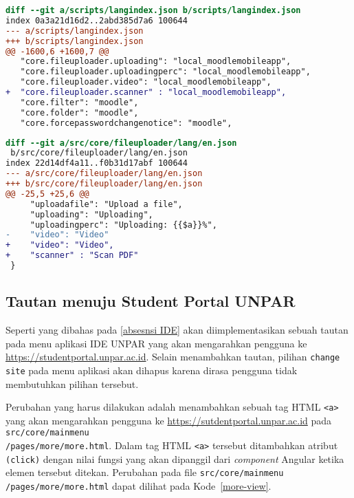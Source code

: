 \begin{lstlisting}[language=diff, frame=single, label ={langindex.json}, caption = Perubahan pada file \texttt{langindex.json} ]
diff --git a/scripts/langindex.json b/scripts/langindex.json
index 0a3a21d16d2..2abd385d7a6 100644
--- a/scripts/langindex.json
+++ b/scripts/langindex.json
@@ -1600,6 +1600,7 @@
   "core.fileuploader.uploading": "local_moodlemobileapp",
   "core.fileuploader.uploadingperc": "local_moodlemobileapp",
   "core.fileuploader.video": "local_moodlemobileapp",
+  "core.fileuploader.scanner" : "local_moodlemobileapp",
   "core.filter": "moodle",
   "core.folder": "moodle",
   "core.forcepasswordchangenotice": "moodle",
\end{lstlisting} 

\begin{lstlisting}[language=diff, frame=single, label ={fileuploader-lang-eng}, caption = Perubahan pada file \texttt{src/core/fileuploader/lang/en.json} ]
diff --git a/src/core/fileuploader/lang/en.json
 b/src/core/fileuploader/lang/en.json
index 22d14df4a11..f0b31d17abf 100644
--- a/src/core/fileuploader/lang/en.json
+++ b/src/core/fileuploader/lang/en.json
@@ -25,5 +25,6 @@
     "uploadafile": "Upload a file",
     "uploading": "Uploading",
     "uploadingperc": "Uploading: {{$a}}%",
-    "video": "Video"
+    "video": "Video",
+    "scanner" : "Scan PDF"
 }
\end{lstlisting} 

\subsection{Tautan menuju Student Portal UNPAR}
Seperti yang dibahas pada \ref{absesnsi IDE} akan diimplementasikan sebuah tautan pada menu aplikasi IDE UNPAR yang akan mengarahkan pengguna ke \url{https://studentportal.unpar.ac.id}. Selain menambahkan tautan, pilihan \texttt{change site} pada menu aplikasi akan dihapus karena dirasa pengguna tidak membutuhkan pilihan tersebut.

Perubahan yang harus dilakukan adalah menambahkan sebuah tag HTML \texttt{<a>} yang akan mengarahkan pengguna ke \url{https://sutdentportal.unpar.ac.id} pada \texttt{src/core/mainmenu\\/pages/more/more.html}. Dalam tag HTML \texttt{<a>} tersebut ditambahkan atribut \texttt{(click)} dengan nilai fungsi yang akan dipanggil dari \textit{component} Angular ketika elemen tersebut ditekan. Perubahan pada file \texttt{src/core/mainmenu\\/pages/more/more.html} dapat dilihat pada \mbox{Kode \ref{more-view}}.

